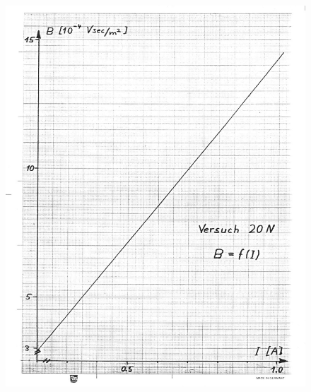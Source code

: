 \begin{figure}[hb]
	\centering
		\includegraphics[width=\textwidth]{Abbildungen/Eichung-HHSpulen.jpg}
	\label{fig:Eichung-HHSpulen}
\end{figure}
